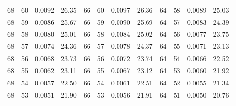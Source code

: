 \begin{tabular}{llll|llll|llll}
68 & 60 & 0.0092 & 26.35 & 66 & 60 & 0.0097 & 26.36 & 64 & 58 & 0.0089 & 25.03\\
68 & 59 & 0.0086 & 25.67 & 66 & 59 & 0.0090 & 25.69 & 64 & 57 & 0.0083 & 24.39\\
68 & 58 & 0.0080 & 25.01 & 66 & 58 & 0.0084 & 25.02 & 64 & 56 & 0.0077 & 23.75\\
68 & 57 & 0.0074 & 24.36 & 66 & 57 & 0.0078 & 24.37 & 64 & 55 & 0.0071 & 23.13\\
68 & 56 & 0.0068 & 23.73 & 66 & 56 & 0.0072 & 23.74 & 64 & 54 & 0.0066 & 22.52\\
68 & 55 & 0.0062 & 23.11 & 66 & 55 & 0.0067 & 23.12 & 64 & 53 & 0.0060 & 21.92\\
68 & 54 & 0.0057 & 22.50 & 66 & 54 & 0.0061 & 22.51 & 64 & 52 & 0.0055 & 21.34\\
68 & 53 & 0.0051 & 21.90 & 66 & 53 & 0.0056 & 21.91 & 64 & 51 & 0.0050 & 20.76\\
\bottomrule
\end{tabular}
\newpage
